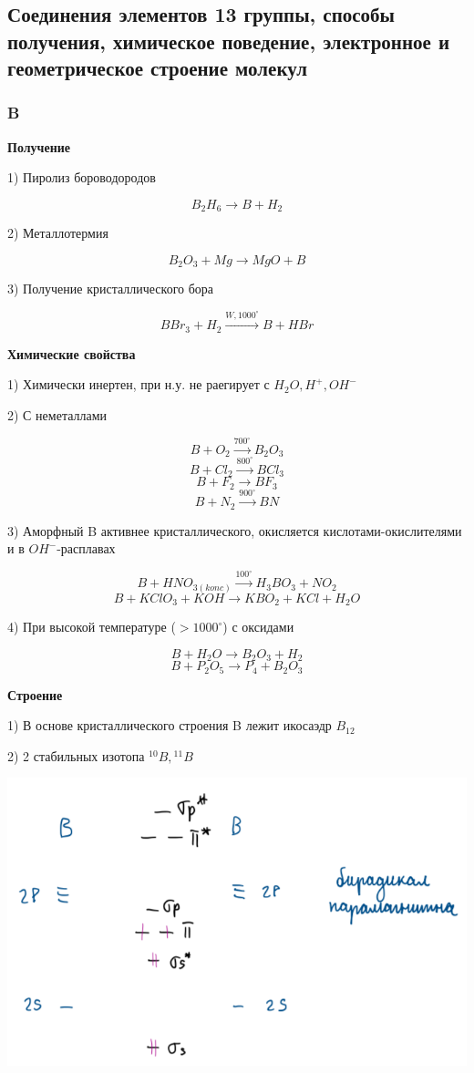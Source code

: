 \subsection{Соединения элементов 13 группы, способы получения, химическое поведение, электронное и геометрическое строение молекул}

\subsubsection*{B}

\textbf{Получение}

1) Пиролиз бороводородов

$$B_2H_6 \rightarrow B + H_2$$

2) Металлотермия

$$B_2O_3 + Mg \rightarrow MgO + B$$

3) Получение кристаллического бора

$$BBr_3 + H_2 \xrightarrow{W, 1000^{\circ}} B + HBr$$

\textbf{Химические свойства}

1) Химически инертен, при н.у.  не раегирует с $H_2O, H^+, OH^-$

2) С неметаллами

$$B + O_2 \xrightarrow{700^{\circ}} B_2O_3$$
$$B + Cl_2 \xrightarrow{800^{\circ}} BCl_3$$
$$B + F_2 \rightarrow BF_3$$
$$B+ N_2 \xrightarrow{900^{\circ}} BN$$


3) Аморфный B активнее кристаллического, окисляется кислотами-окислителями и в $OH^-$-расплавах

$$B + HNO_{3(konc)} \xrightarrow{100^{\circ}} H_3BO_3 + NO_2$$
$$B + KClO_3 + KOH \rightarrow KBO_2 + KCl + H_2O$$

4) При высокой температуре ($>1000^{\circ}$) с оксидами

$$B + H_2O \rightarrow B_2O_3 +H_2$$
$$B + P_2O_5 \rightarrow P_4 + B_2O_3$$

\textbf{Строение}

1) В основе кристаллического строения B лежит икосаэдр $B_{12}$

2) 2 стабильных изотопа ${^{10}B}, {^{11}B}$

\includegraphics{images/11v1.png}

